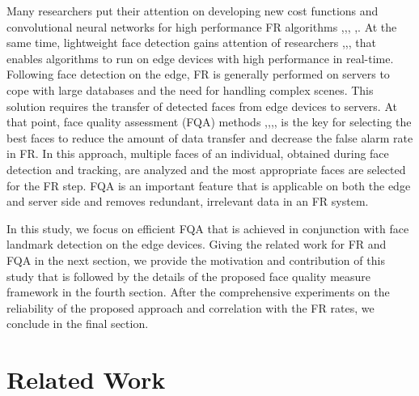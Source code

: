 \documentclass[runningheads]{llncs}
\begin{document}
Many researchers put their attention on developing new cost functions and convolutional neural networks for high performance FR algorithms \cite{SphereFace2017},\cite{CosFace2018},\cite{ArcFace2018}, \cite{MobileFacenet2018},\cite{Vargfacenet2019}. At the same time, lightweight face detection gains attention of researchers \cite{Mtcnn2016},\cite{SSH2017},\cite{S3fd2017},\cite{RetinaFace2019} that enables algorithms to run on edge devices with high performance in real-time. Following face detection on the edge, FR is generally performed on servers to cope with large databases and the need for handling complex scenes. This solution requires the transfer of detected faces from edge devices to servers. At that point, face quality assessment (FQA) methods \cite{Abaza},\cite{Vignesh-2015},\cite{QiCNN},\cite{Lienhard-2015},\cite{HernandezOrtega2019} is the key for selecting the best faces to reduce the amount of data transfer and decrease the false alarm rate in FR. In this approach, multiple faces of an individual, obtained during face detection and tracking, are analyzed and the most appropriate faces are selected for the FR step. FQA is an important feature that is applicable on both the edge and server side and removes redundant, irrelevant data in an FR system. 

In this study, we focus on efficient FQA that is achieved in conjunction with face landmark detection on the edge devices. Giving the related work for FR and FQA in the next section, we provide the motivation and contribution of this study that is followed by the details of the proposed face quality measure framework in the fourth section. After the comprehensive experiments on the reliability of the proposed approach and correlation with the FR rates, we conclude in the final section.
    
\section{Related Work}
\end{document}
